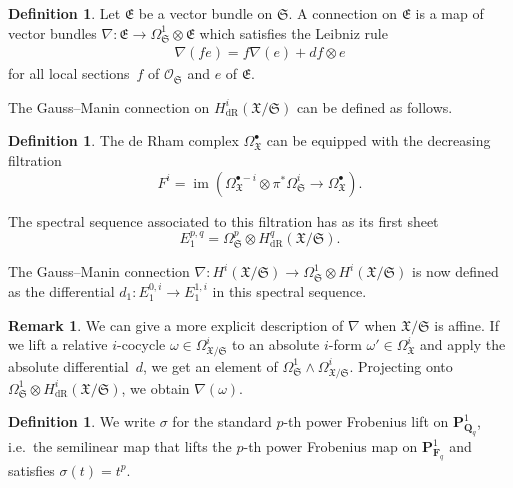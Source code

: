 \documentclass[a4paper,11pt]{article}
\numberwithin{equation}{section}
\newcommand{\QQ}{\mathbf{Q}} %
\newcommand{\FF}{\mathbf{F}} %
\DeclareMathOperator{\fIm}{im}       %
\providecommand{\HdR}{H_{\text{dR}}}    %
\theoremstyle{definition}
\newtheorem{defn}[thm]{Definition}
\newtheorem{rem}[thm]{Remark}
\begin{document}
\begin{defn}
Let $\mathfrak{E}$ be a vector bundle on $\mathfrak{S}$. A connection on 
$\mathfrak{E}$ is a map of vector bundles 
$\nabla: \mathfrak{E} \rightarrow \Omega^1_{\mathfrak{S}} \otimes \mathfrak{E}$
which satisfies the Leibniz rule
\begin{align*}
\nabla(f e)=f\nabla(e)+df \otimes e
\end{align*} 
for all local sections~$f$ of $\mathcal{O}_{\mathfrak{S}}$ and $e$ 
of $\mathfrak{E}$.
\end{defn}

The Gauss--Manin connection on $\HdR^i(\mathfrak{X}/\mathfrak{S})$ can 
be defined as follows.

\begin{defn}
The de Rham complex $\Omega^{\bullet}_{\mathfrak{X}}$ can be equipped 
with the decreasing filtration
\[
F^i=\fIm(\Omega^{\bullet-i}_{\mathfrak{X}} \otimes \pi^* \Omega^i_{\mathfrak{S}} \rightarrow \Omega^{\bullet}_{\mathfrak{X}}). 
\]

The spectral sequence associated to this filtration has as its first sheet 
\[
E_1^{p,q}=\Omega^p_{\mathfrak{S}} \otimes \HdR^q(\mathfrak{X}/\mathfrak{S}).
\]

The Gauss--Manin connection 
$\nabla:H^i(\mathfrak{X}/\mathfrak{S}) \rightarrow \Omega^1_{\mathfrak{S}} \otimes H^i(\mathfrak{X}/\mathfrak{S})$ 
is now defined as the differential $d_1: E_1^{0,i} \rightarrow E_1^{1,i}$ 
in this spectral sequence.
\end{defn}

\begin{rem}
We can give a more explicit description of $\nabla$ when 
$\mathfrak{X}/\mathfrak{S}$ is affine. If we lift a relative $i$-cocycle 
$\omega \in \Omega^i_{\mathfrak{X}/\mathfrak{S}}$ to an absolute $i$-form 
$\omega' \in \Omega^i_{\mathfrak{X}}$ and apply the absolute differential~$d$, 
we get an element of 
$\Omega^1_{\mathfrak{S}} \wedge \Omega^i_{\mathfrak{X}/\mathfrak{S}}$. 
Projecting onto 
$\Omega^1_{\mathfrak{S}} \otimes \HdR^i(\mathfrak{X}/\mathfrak{S})$, 
we obtain $\nabla(\omega)$. 
\end{rem}

\begin{defn} \label{defn:sigma}
We write $\sigma$ for the standard $p$-th power Frobenius lift on 
$\mathbf{P}^1_{\QQ_q}$, i.e.\ the semilinear map that lifts the $p$-th power 
Frobenius map on $\mathbf{P}^1_{\FF_q}$ and satisfies $\sigma(t)=t^p$. 
\end{defn}
\end{document}
